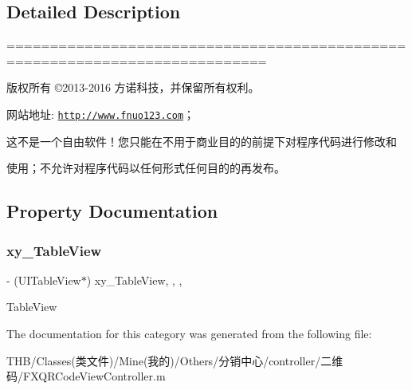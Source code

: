 \subsection{Detailed Description}
============================================================================

版权所有 ©2013-\/2016 方诺科技，并保留所有权利。

网站地址\+: \href{http://www.fnuo123.com}{\tt http\+://www.\+fnuo123.\+com}； 



这不是一个自由软件！您只能在不用于商业目的的前提下对程序代码进行修改和

使用；不允许对程序代码以任何形式任何目的的再发布。 

 

\subsection{Property Documentation}
\mbox{\label{category_f_x_q_r_code_view_controller_07_08_a26cb02f1d514074637d34dad480b2c27}} 
\subsubsection{\texorpdfstring{xy\+\_\+\+Table\+View}{xy\_TableView}}
{\footnotesize\ttfamily -\/ (U\+I\+Table\+View$\ast$) xy\+\_\+\+Table\+View\hspace{0.3cm}{\ttfamily [read]}, {\ttfamily [write]}, {\ttfamily [nonatomic]}, {\ttfamily [strong]}}

Table\+View 

The documentation for this category was generated from the following file\+:\begin{DoxyCompactItemize}
\item 
T\+H\+B/\+Classes(类文件)/\+Mine(我的)/\+Others/分销中心/controller/二维码/F\+X\+Q\+R\+Code\+View\+Controller.\+m\end{DoxyCompactItemize}
